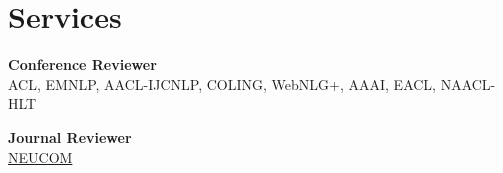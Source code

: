 
\section{\sc Services}

{\bf Conference Reviewer} \\
ACL,
EMNLP,
AACL-IJCNLP,
COLING,
WebNLG+,
AAAI,
EACL,
NAACL-HLT

{\bf Journal Reviewer} \\
\href{https://www.journals.elsevier.com/neurocomputing}{NEUCOM}
